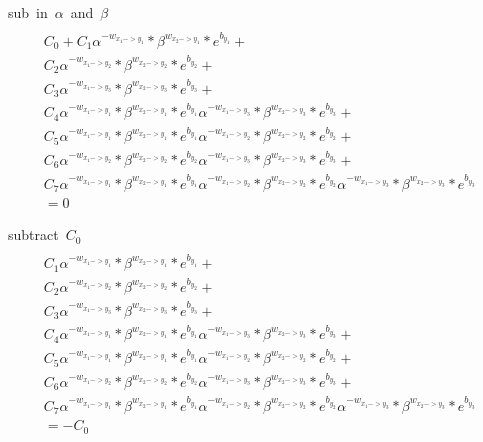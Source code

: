 \documentclass{article}
\begin{document}
\hbox{sub in $\alpha$ and $\beta$}
\begin{multline}\\
    C_0 + 
    C_1\alpha^{-w_{x_1->y_1}}*\beta^{w_{x_2->y_1}} *e^{b_{y_1}} + \\
    C_2\alpha^{-w_{x_1->y_2}}*\beta^{w_{x_2->y_2}} *e^{b_{y_2}} + \\
    C_3\alpha^{-w_{x_1->y_3}}*\beta^{w_{x_2->y_3}} *e^{b_{y_3}} + \\
    C_4\alpha^{-w_{x_1->y_1}}*\beta^{w_{x_2->y_1}} *e^{b_{y_1}} \alpha^{-w_{x_1->y_3}}*\beta^{w_{x_2->y_3}} *e^{b_{y_3}} + \\
    C_5\alpha^{-w_{x_1->y_1}}*\beta^{w_{x_2->y_1}} *e^{b_{y_1}} \alpha^{-w_{x_1->y_2}}*\beta^{w_{x_2->y_2}} *e^{b_{y_2}} + \\
    C_6\alpha^{-w_{x_1->y_2}}*\beta^{w_{x_2->y_2}} *e^{b_{y_2}} \alpha^{-w_{x_1->y_3}}*\beta^{w_{x_2->y_3}} *e^{b_{y_3}} + \\
    C_7\alpha^{-w_{x_1->y_1}}*\beta^{w_{x_2->y_1}} *e^{b_{y_1}} \alpha^{-w_{x_1->y_2}}*\beta^{w_{x_2->y_2}} *e^{b_{y_2}} \alpha^{-w_{x_1->y_3}}*\beta^{w_{x_2->y_3}}*e^{b_{y_3}} \\
    = 0
\end{multline}


\hbox{subtract $C_0$}
\begin{multline}\\
    C_1\alpha^{-w_{x_1->y_1}}*\beta^{w_{x_2->y_1}} *e^{b_{y_1}} + \\
    C_2\alpha^{-w_{x_1->y_2}}*\beta^{w_{x_2->y_2}} *e^{b_{y_2}} + \\
    C_3\alpha^{-w_{x_1->y_3}}*\beta^{w_{x_2->y_3}} *e^{b_{y_3}} + \\
    C_4\alpha^{-w_{x_1->y_1}}*\beta^{w_{x_2->y_1}} *e^{b_{y_1}} \alpha^{-w_{x_1->y_3}}*\beta^{w_{x_2->y_3}} *e^{b_{y_3}} + \\
    C_5\alpha^{-w_{x_1->y_1}}*\beta^{w_{x_2->y_1}} *e^{b_{y_1}} \alpha^{-w_{x_1->y_2}}*\beta^{w_{x_2->y_2}} *e^{b_{y_2}} + \\
    C_6\alpha^{-w_{x_1->y_2}}*\beta^{w_{x_2->y_2}} *e^{b_{y_2}} \alpha^{-w_{x_1->y_3}}*\beta^{w_{x_2->y_3}} *e^{b_{y_3}} + \\
    C_7\alpha^{-w_{x_1->y_1}}*\beta^{w_{x_2->y_1}} *e^{b_{y_1}} \alpha^{-w_{x_1->y_2}}*\beta^{w_{x_2->y_2}} *e^{b_{y_2}} \alpha^{-w_{x_1->y_3}}*\beta^{w_{x_2->y_3}}*e^{b_{y_3}} \\
    = -C_0
\end{multline}
\end{document}
